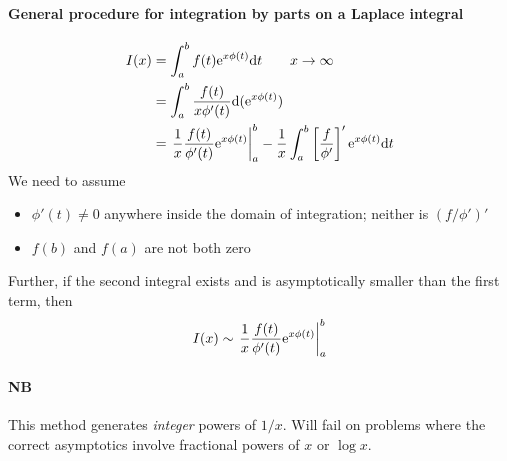 \paragraph{General procedure for integration by parts on a Laplace integral}
\begin{align*}
	I(x) &= \int_{a}^{b} f(t) \mathrm{e}^{x \phi (t)} \mathrm{d} t \qquad x \rightarrow \infty \\
	&= \int_{a}^{b}  \frac{f(t)}{x \phi'(t)} \mathrm{d} (\mathrm{e}^{x \phi(t)}) \\
	&= \left. \frac{1}{x} \frac{f(t)}{\phi'(t)} \mathrm{e}^{x \phi(t)} \right|^b_a - \frac{1}{x}\int_{a}^{b} \left[\frac{f}{\phi'}\right]' \mathrm{e}^{x \phi(t)} \mathrm{d} t
\end{align*}
We need to assume
\begin{itemize}
	\item $\phi'(t) \neq 0$ anywhere inside the domain of integration; neither is $(f/\phi')'$
	\item $f(b)$ and $f(a)$ are not both zero
\end{itemize}
Further, if the second integral exists and is asymptotically smaller than the first term, then 
\begin{gather*}
	I(x) \sim \left. \frac{1}{x} \frac{f(t)}{\phi'(t)} \mathrm{e}^{x \phi(t)} \right|^b_a
\end{gather*}
\paragraph{NB} This method generates \emph{integer} powers of $1/x$. Will fail on problems where the correct asymptotics involve fractional powers of $x$ or $\log x$.
